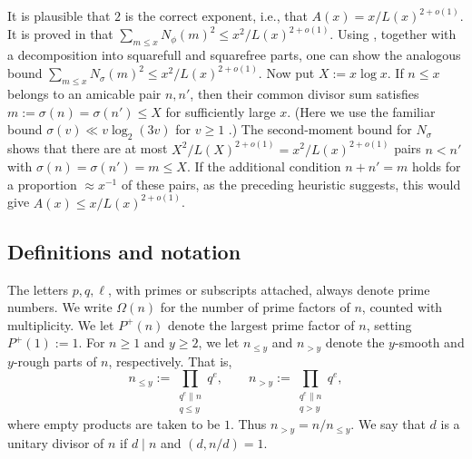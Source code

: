 \documentclass[11pt]{amsart}
\begin{document}
It is plausible that $2$ is the correct exponent, i.e., that
$A(x)=x/L(x)^{2+o(1)}$. It is proved in
\cite[Corollary 2]{Pollack2019} that
$\sum_{m\le x}N_\phi(m)^2\le x^2/L(x)^{2+o(1)}$.
Using \cite[Corollary 1.2]{Pollack2021}, together with a
decomposition into squarefull and squarefree parts, one can show
the analogous bound
$\sum_{m\le x}N_\sigma(m)^2\le x^2/L(x)^{2+o(1)}$.
Now put $X:=x\log x$. If $n\le x$ belongs to an amicable pair
$n,n'$, then their common divisor sum satisfies
$m:=\sigma(n)=\sigma(n')\le X$ for sufficiently large $x$.
(Here we use the familiar bound
$\sigma(v)\ll v\log_2(3v)$ for $v\ge1$
\cite[Theorem 323, p.~350]{HardyWright2008}.)
The second-moment bound for $N_\sigma$ shows that there are
at most $X^2/L(X)^{2+o(1)}=x^2/L(x)^{2+o(1)}$ pairs
$n<n'$ with $\sigma(n)=\sigma(n')=m \le X$. If the additional condition \(n+n'= m\) holds for a proportion \(\approx x^{-1}\) of these pairs, as the preceding heuristic suggests, this would give \(A(x)\le x/L(x)^{2+o(1)}\).



\subsection*{Definitions and notation} The letters $p,q,\ell$, with primes or subscripts attached, always denote prime numbers. We write $\Omega(n)$ for the number of prime factors of $n$, counted with multiplicity. We let $P^{+}(n)$ denote the largest prime factor of $n$, setting $P^{+}(1):=1$. For $n\ge1$ and $y\ge2$, we let $n_{\le y}$ and $n_{>y}$ denote the \textsf{$y$-smooth} and \textsf{$y$-rough} parts of $n$, respectively. That is,
\[ n_{\le y}:=\prod_{\substack{q^e\parallel n\\q\le y}}q^e, \qquad
 n_{>y}:=\prod_{\substack{q^e\parallel n\\q>y}}q^e,
\]
where empty products are taken to be $1$. Thus $n_{>y}=n/n_{\le y}$. We say that $d$ is a \textsf{unitary divisor} of $n$ if $d\mid n$ and $(d,n/d)=1$.
\end{document}
